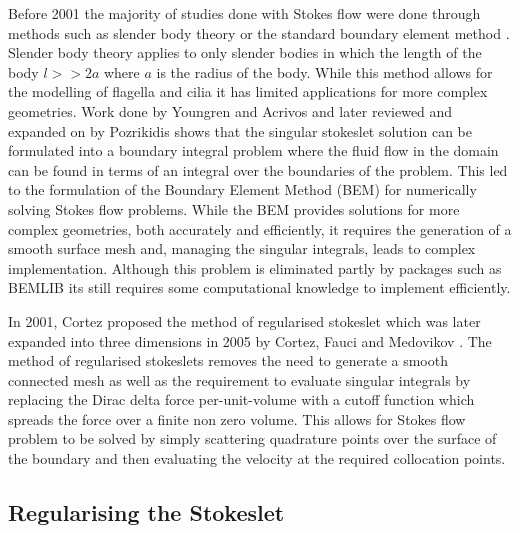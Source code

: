 Before 2001 the majority of studies done with Stokes flow were done through methods such as slender body theory \cite{Walker2020AFilaments,Johnson1980AnFlow} or the standard boundary element method \cite{Acrivos1975StokesSolution,Pozrikidis1992BoundaryFlow,Tran-Cong1987APropulsion}. Slender body theory applies to only slender bodies in which the length of the body $l >> 2a$ where $a$ is the radius of the body. While this method allows for the modelling of flagella and cilia it has limited applications for more complex geometries. Work done by Youngren and Acrivos \cite{Acrivos1975StokesSolution} and later reviewed and expanded on by Pozrikidis \cite{Pozrikidis1992BoundaryFlow} shows that the singular stokeslet solution can be formulated into a boundary integral problem where the fluid flow in the domain can be found in terms of an integral over the boundaries of the problem. This led to the formulation of the Boundary Element Method (BEM) for numerically solving Stokes flow problems. While the BEM provides solutions for more complex geometries, both accurately and efficiently, it requires the generation of a smooth surface mesh and, managing the singular integrals, leads to complex implementation. Although this problem is eliminated partly by packages such as BEMLIB \cite{Pozrikidis2002ABEMLIB} its still requires some computational knowledge to implement efficiently.

In 2001, Cortez \cite{Cortez2001} proposed the method of regularised stokeslet which was later expanded into three dimensions in 2005 by Cortez, Fauci and Medovikov \cite{Cortez2005}. The method of regularised stokeslets removes the need to generate a smooth connected mesh as well as the requirement to evaluate singular integrals by replacing the Dirac delta force per-unit-volume with a cutoff function which spreads the force over a finite non zero volume. This allows for Stokes flow problem to be solved by simply scattering quadrature points over the surface of the boundary and then evaluating the velocity at the required collocation points.

\subsection{Regularising the Stokeslet}

